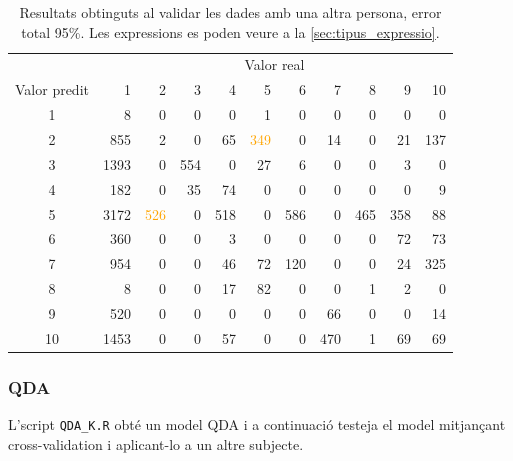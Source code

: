 \documentclass[a4paper]{article}
\begin{document}
\begin{table}[H]
	\centering
	\def\arraystretch{1.2}
	\begin{tabular}{|c|rrrrrrrrrr|}
		\hline
		& \multicolumn{10}{c|}{Valor real} \\
		Valor predit & 1 & 2 & 3 & 4 & 5 & 6 & 7 & 8 & 9 & 10 \\
		\hline
		1 & 8 & 0 & 0 & 0 & 1 & 0 & 0 & 0 & 0 & 0\\
		2 & 855 & 2 & 0 & 65 & \textcolor{Orange}{349} & 0 & 14 & 0 & 21 & 137\\
		3 & 1393 & 0 & 554 & 0 & 27 & 6 & 0 & 0 & 3 & 0\\
		4 & 182 & 0 & 35 & 74 & 0 & 0 & 0 & 0 & 0 & 9\\
		5 & 3172 & \textcolor{Orange}{526} & 0 & 518 & 0 & 586 & 0 & 465 & 358 & 88\\
		6 & 360 & 0 & 0 & 3 & 0 & 0 & 0 & 0 & 72 & 73\\
		7 & 954 & 0 & 0 & 46 & 72 & 120 & 0 & 0 & 24 & 325\\
		8 & 8 & 0 & 0 & 17 & 82 & 0 & 0 & 1 & 2 & 0\\
		9 & 520 & 0 & 0 & 0 & 0 & 0 & 66 & 0 & 0 & 14\\
		10 & 1453 & 0 & 0 & 57 & 0 & 0 & 470 & 1 & 69 & 69\\
		\hline
	\end{tabular}
\captionsetup{width=0.8\textwidth}
	\caption{Resultats obtinguts al validar les dades amb una altra persona, error total 95\%. Les expressions es poden veure a la \autoref{sec:tipus_expressio}.}
\end{table}

\begin{figure}[H]
	\centering
\end{figure}

\subsubsection{QDA}
L’script \verb|QDA_K.R|  obté un model QDA i a continuació testeja el model mitjançant cross-validation i aplicant-lo a un altre subjecte.
\end{document}
